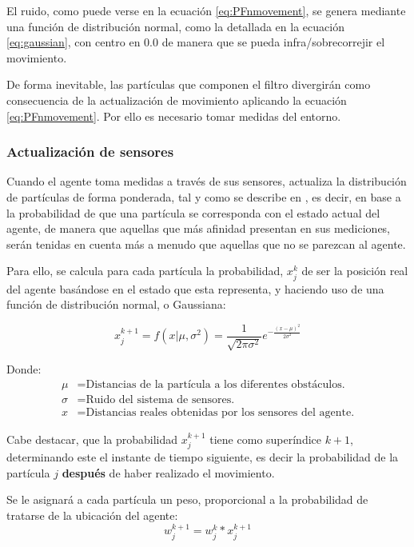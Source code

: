 \noindent El ruido, como puede verse en la ecuación \ref{eq:PFnmovement}, se genera mediante una función de distribución normal, como la detallada en la ecuación \ref{eq:gaussian}, con centro en $0.0$ de manera que se pueda infra/sobrecorrejir el movimiento.


De forma inevitable, las partículas que componen el filtro divergirán como consecuencia de la actualización de movimiento aplicando la ecuación \ref{eq:PFnmovement}. Por ello es necesario tomar medidas del entorno.

\subsubsection{Actualización de sensores}
Cuando el agente toma medidas a través de sus sensores, actualiza la distribución de partículas de forma ponderada, tal y como se describe en \citep{art:PFTuto, art:PFBL}, es decir, en base a la probabilidad de que una partícula se corresponda con el estado actual del agente, de manera que aquellas que más afinidad presentan en sus mediciones, serán tenidas en cuenta más a menudo que aquellas que no se parezcan al agente.

Para ello, se calcula para cada partícula la probabilidad, $x_j^{k}$ de ser la posición real del agente basándose en el estado que esta representa, y haciendo uso de una función de distribución normal, o Gaussiana:

\begin{equation}
\label{eq:gaussian}
x_j^{k+1} = f(x|\mu, \sigma^2)=\frac{1}{\sqrt{2\pi \sigma^2}}e^{-\frac{(x-\mu)^2}{2\sigma^2}}
\end{equation}

Donde:
\begin{align*}
\mu &= \text{Distancias de la partícula a los diferentes obstáculos.}\\
\sigma &= \text{Ruido del sistema de sensores.}\\
x &= \text{Distancias reales obtenidas por los sensores del agente.}
\end{align*}

Cabe destacar, que la probabilidad $x_j^{k+1}$ tiene como superíndice $k+1$, determinando este el instante de tiempo siguiente, es decir la probabilidad de la partícula $j$ \textbf{después} de haber realizado el movimiento.

Se le asignará a cada partícula un peso, proporcional a la probabilidad de tratarse de la ubicación del agente:
\begin{equation}
w_j^{k+1}=w_j^{k}*x_j^{k+1}
\end{equation}

